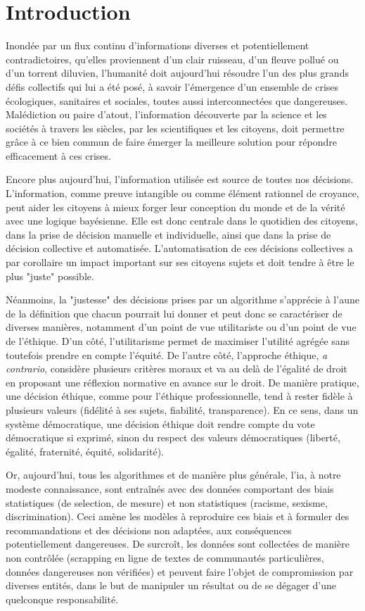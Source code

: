 \section{Introduction}

Inondée par un flux continu d'informations diverses et potentiellement contradictoires, qu'elles proviennent d'un clair ruisseau, d'un fleuve pollué ou d'un torrent diluvien, l'humanité doit aujourd'hui résoudre l'un des plus grands défis collectifs qui lui a été posé, à savoir l'émergence d'un ensemble de crises écologiques, sanitaires et sociales, toutes aussi interconnectées que dangereuses. Malédiction ou paire d'atout, l'information découverte par la science et les sociétés à travers les siècles, par les scientifiques et les citoyens, doit permettre grâce à ce bien commun de faire émerger la meilleure solution pour répondre efficacement à ces crises. 

Encore plus aujourd'hui, l'information utilisée est source de toutes nos décisions. L'information, comme preuve intangible ou comme élément rationnel de croyance, peut aider les citoyens à mieux forger leur conception du monde et de la vérité avec une logique bayésienne. Elle est donc centrale dans le quotidien des citoyens, dans la prise de décision manuelle et individuelle, ainsi que dans la prise de décision collective et automatisée. L'automatisation de ces décisions collectives a par corollaire un impact important sur ses citoyens sujets et doit tendre à être le plus "juste" possible.

Néanmoins, la "justesse" des décisions prises par un algorithme s'apprécie à l'aune de la définition que chacun pourrait lui donner et peut donc se caractériser de diverses manières, notamment d'un point de vue utilitariste ou d'un point de vue de l'éthique. D'un côté, l'utilitarisme permet de maximiser l'utilité agrégée sans toutefois prendre en compte l'équité. De l'autre côté, l'approche éthique, \textit{a contrario}, considère plusieurs critères moraux et va au delà de l'égalité de droit en proposant une réflexion normative en avance sur le droit. De manière pratique, une décision éthique, comme pour l'éthique professionnelle, tend à rester fidèle à plusieurs valeurs (fidélité à ses sujets, fiabilité, transparence). En ce sens, dans un système démocratique, une décision éthique doit rendre compte du vote démocratique si exprimé, sinon du respect des valeurs démocratiques (liberté, égalité, fraternité, équité, solidarité).

Or, aujourd'hui, tous les algorithmes et de manière plus générale, l'\Gls{ia}, à notre modeste connaissance, sont entraînés avec des données comportant des biais statistiques (de selection, de mesure) et non statistiques (racisme, sexisme, discrimination). Ceci amène les modèles à reproduire ces biais et à formuler des recommandations et des décisions non adaptées, aux conséquences potentiellement dangereuses. De surcroît, les données sont collectées de manière non contrôlée (scrapping en ligne de textes de communautés particulières, données dangereuses non vérifiées) et peuvent faire l'objet de compromission par diverses entités, dans le but de manipuler un résultat ou de se dégager d'une quelconque responsabilité.

